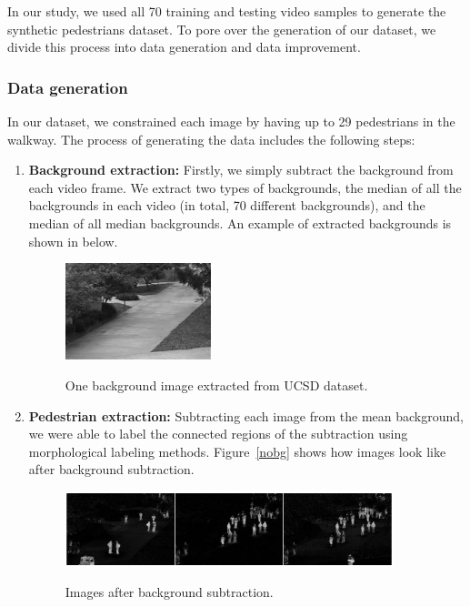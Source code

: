 \indent In our study, we used all 70 training and testing video samples to generate the synthetic pedestrians dataset. To pore over the generation of our dataset, we divide this process into data generation and data improvement.

  
\subsubsection{Data generation}

In our dataset, we constrained each image by having up to 29 pedestrians in the walkway. The process of generating the data includes the following steps:
\begin{enumerate}

\item \textbf{Background extraction:} Firstly, we simply subtract the background from each video frame. We extract two types of backgrounds, the median of all the backgrounds in each video (in total, 70 different backgrounds), and the median of all median backgrounds. An example of extracted backgrounds is shown in below.

\begin{figure}[H]
	\centering
	{\includegraphics[width=0.4\textwidth]{images/background}}
	\caption{One background image extracted from UCSD dataset.}
	\label{fig:bgim}
\end{figure}


\item \textbf{Pedestrian extraction:} Subtracting each image from the mean background, we were able to label the connected regions of the subtraction using morphological labeling methods. Figure~\ref{nobg} shows how images look like after background subtraction. 
\begin{figure}[H]
	\centering
	{\includegraphics[width=0.9\textwidth]{images/nobg}}
	\caption{Images after background subtraction.}
	\label{fig:nobg}
\end{figure}
 

\end{enumerate}
